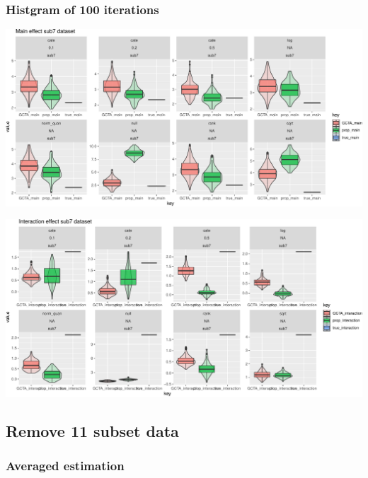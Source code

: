 \documentclass[]{article}
\begin{document}

\clearpage

\subsubsection{Histgram of 100
iterations}\label{histgram-of-100-iterations-1}

\includegraphics{Fixed_effect_simulation_files/figure-latex/sub7_main-1.pdf}

\includegraphics{Fixed_effect_simulation_files/figure-latex/sub7_inter-1.pdf}

\subsection{Remove 11 subset data}\label{remove-11-subset-data}

\subsubsection{Averaged estimation}\label{averaged-estimation-2}

\end{document}
